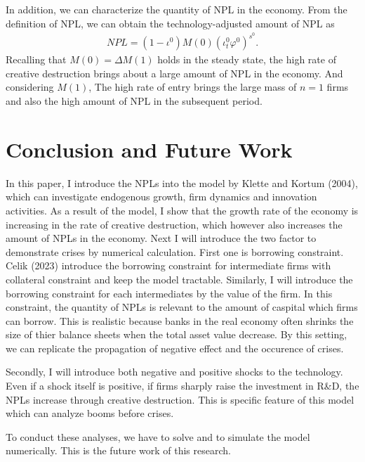 \documentclass[a4paper,12pt]{article}
\begin{document}
In addition, we can characterize the quantity of NPL in the economy. From the definition of NPL, we can obtain the technology-adjusted amount of NPL as
\begin{align}
    NPL = (1-\iota^0)M(0) (\iota_t^0\varphi^0)^{s^0}.
\end{align}
Recalling that $M(0) = \Delta M(1)$ holds in the steady state, the high rate of creative destruction brings about a large amount of NPL in the economy. And considering $M(1)$, The high rate of entry brings the large mass of $n=1$ firms and also the high amount of NPL in the subsequent period. \par

\section{Conclusion and Future Work}
In this paper, I introduce the NPLs into the model by Klette and Kortum (2004), which can investigate endogenous growth, firm dynamics and innovation activities. As a result of the model, I show that the growth rate of the economy is increasing in the rate of creative destruction, which however also increases the amount of NPLs in the economy.  
Next I will introduce the two factor to demonstrate crises by numerical calculation. First one is borrowing constraint. Celik (2023) introduce the borrowing constraint for intermediate firms with collateral constraint and keep the model tractable. Similarly, I will introduce the borrowing constraint for each intermediates by the value of the firm. In this constraint, the quantity of NPLs is relevant to the amount of caspital which firms can borrow. This is realistic because banks in the real economy often shrinks the size of thier balance sheets when the total asset value decrease. By this setting, we can replicate the propagation of negative effect and the occurence of crises. \par
Secondly, I will introduce both negative and positive shocks to the technology. Even if a shock itself is positive, if firms sharply raise the investment in R\&D, the NPLs increase through creative destruction. This is specific feature of this model which can analyze booms before crises.\par
To conduct these analyses, we have to solve and to simulate the model numerically. This is the future work of this research.
\end{document}
